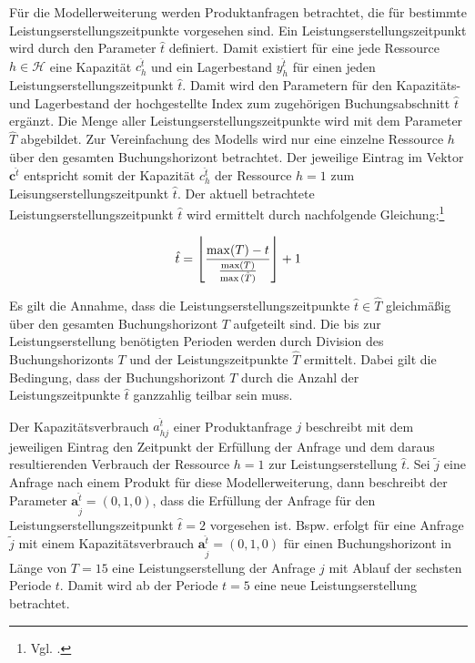 Für die Modellerweiterung werden Produktanfragen betrachtet, die für bestimmte Leistungserstellungszeitpunkte vorgesehen sind. Ein Leistungserstellungszeitpunkt wird durch den Parameter $\hat{t}$ definiert. Damit existiert für eine jede Ressource $h\in\mathcal{H}$ eine Kapazität $c_h^{\hat t}$ und ein Lagerbestand $y_h^{\hat t}$ für einen jeden Leistungserstellungszeitpunkt $\hat{t}$. Damit wird den Parametern für den Kapazitäts- und Lagerbestand der hochgestellte Index zum zugehörigen Buchungsabschnitt $\hat{t}$ ergänzt. Die Menge aller Leistungserstellungszeitpunkte wird mit dem Parameter $\hat T$ abgebildet. Zur Vereinfachung des Modells wird nur eine einzelne Ressource $h$ über den gesamten Buchungshorizont betrachtet. Der jeweilige Eintrag im Vektor $\textbf{c}^{\hat t}$ entspricht somit der Kapazität $c_h^{\hat t}$ der Ressource $h=1$ zum Leisungserstellungszeitpunkt $\hat{t}$. Der aktuell betrachtete Leistungserstellungszeitpunkt $\hat t$ wird ermittelt durch nachfolgende Gleichung:\footnote{Vgl. \cite{lars}.}

\begin{equation}\label{lp}
\hat t = \floor*{\frac{\max(T) -t}{\frac{\max(T)}{\max\hat{(T)}}}}+1
\end{equation}

Es gilt die Annahme, dass die Leistungserstellungszeitpunkte $\hat t\in \hat T$ gleichmäßig über den gesamten Buchungshorizont $T$ aufgeteilt sind. Die bis zur Leistungserstellung benötigten Perioden werden durch Division des Buchungshorizonts $T$ und der Leistungszeitpunkte $\hat T$ ermittelt. Dabei gilt die Bedingung, dass der Buchungshorizont $T$ durch die Anzahl der Leistungszeitpunkte $\hat t$ ganzzahlig teilbar sein muss.

Der Kapazitätsverbrauch $a_{hj}^{\hat t}$ einer Produktanfrage $j$ beschreibt mit dem jeweiligen Eintrag den Zeitpunkt der Erfüllung der Anfrage und dem daraus resultierenden Verbrauch der Ressource $h=1$ zur Leistungserstellung $\hat t$. Sei $\tilde{j}$ eine Anfrage nach einem Produkt für diese Modellerweiterung, dann beschreibt der Parameter $\textbf{a}_{\tilde{j}}^{\hat t}=(0,1,0)$, dass die Erfüllung der Anfrage für den Leistungserstellungszeitpunkt $\hat{t}=2$ vorgesehen ist.  Bspw. erfolgt für eine Anfrage $\tilde j$ mit einem Kapazitätsverbrauch $\textbf{a}^{\hat t}_{\tilde{j}}=(0,1,0)$ für einen Buchungshorizont in Länge von $T=15$ eine Leistungserstellung der Anfrage $j$ mit Ablauf der sechsten Periode $t$. Damit wird ab der Periode $t=5$ eine neue Leistungserstellung betrachtet.\\[.5cm]

